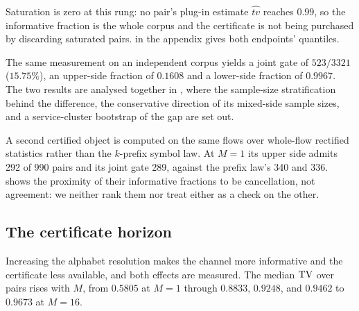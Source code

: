 Saturation is zero at this rung: no pair's plug-in estimate $\widehat{tv}$
reaches $0.99$, so the informative fraction is the whole corpus and the
certificate is not being purchased by discarding saturated pairs.
 in the appendix gives both endpoints' quantiles.

The same measurement on an independent corpus yields a joint gate of
$523/3321$ ($15.75\%$), an upper-side fraction of $0.1608$ and a lower-side
fraction of $0.9967$. The two results are analysed together in
, where the sample-size stratification behind the
difference, the conservative direction of its mixed-side sample sizes, and a
service-cluster bootstrap of the gap are set out.

A second certified object is computed on the same flows over whole-flow rectified
statistics rather than the $k$-prefix symbol law. At $M{=}1$ its upper side admits
292 of 990 pairs and its joint gate 289, against the prefix law's 340 and 336.
 shows the proximity of their informative fractions
to be cancellation, not agreement: we neither rank them nor treat either as a
check on the other.

\subsection{The certificate horizon}
\label{sec:results/horizon}

Increasing the alphabet resolution makes the channel more informative and the
certificate less available, and both effects are measured. The median $\mathrm{TV}$ over
pairs rises with $M$, from $0.5805$ at $M{=}1$ through $0.8833$, $0.9248$, and
$0.9462$ to $0.9673$ at $M{=}16$.

